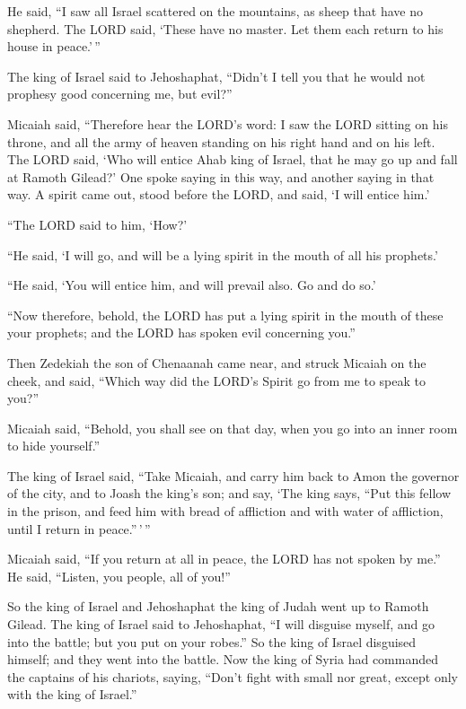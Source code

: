  He said, ``I saw all Israel scattered on the mountains, as
sheep that have no shepherd. The LORD said, `These have no master. Let
them each return to his house in peace.'\,''

 The king of Israel said to Jehoshaphat, ``Didn't I tell
you that he would not prophesy good concerning me, but evil?''

 Micaiah said, ``Therefore hear the LORD's word: I saw the
LORD sitting on his throne, and all the army of heaven standing on his
right hand and on his left.  The LORD said, `Who will
entice Ahab king of Israel, that he may go up and fall at Ramoth
Gilead?' One spoke saying in this way, and another saying in that way.
 A spirit came out, stood before the LORD, and said, `I
will entice him.'

``The LORD said to him, `How?'

 ``He said, `I will go, and will be a lying spirit in the
mouth of all his prophets.'

``He said, `You will entice him, and will prevail also. Go and do so.'

 ``Now therefore, behold, the LORD has put a lying spirit
in the mouth of these your prophets; and the LORD has spoken evil
concerning you.''

 Then Zedekiah the son of Chenaanah came near, and struck
Micaiah on the cheek, and said, ``Which way did the LORD's Spirit go
from me to speak to you?''

 Micaiah said, ``Behold, you shall see on that day, when
you go into an inner room to hide yourself.''

 The king of Israel said, ``Take Micaiah, and carry him
back to Amon the governor of the city, and to Joash the king's son;
 and say, `The king says, ``Put this fellow in the prison,
and feed him with bread of affliction and with water of affliction,
until I return in peace.''\,'\,''

 Micaiah said, ``If you return at all in peace, the LORD
has not spoken by me.'' He said, ``Listen, you people, all of you!''

 So the king of Israel and Jehoshaphat the king of Judah
went up to Ramoth Gilead.  The king of Israel said to
Jehoshaphat, ``I will disguise myself, and go into the battle; but you
put on your robes.'' So the king of Israel disguised himself; and they
went into the battle.  Now the king of Syria had commanded
the captains of his chariots, saying, ``Don't fight with small nor
great, except only with the king of Israel.''

